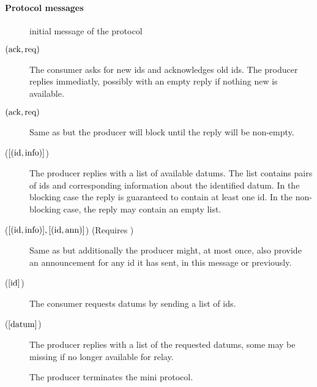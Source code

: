 \paragraph{Protocol messages}
\begin{description}
\item [\MsgInit] initial message of the protocol
\item [\MsgRequestIdsNB{} {\boldmath $(\text{ack}{},\text{req}{})$}]
      The consumer asks for new ids and acknowledges old ids.
      The producer replies immediatly, possibly with an empty reply if nothing new is available.
\item [\MsgRequestIdsB{} {\boldmath $(\text{ack}{},\text{req}{})$}]
      Same as \MsgRequestIdsNB{} but the producer will block until the reply will be non-empty.
\item [\MsgReplyIds{} {\boldmath ($[ (\text{id}{}, \text{info}) ]$) }]
      The producer replies with a list of available datums.
      The list contains pairs of ids and corresponding information about the identified datum.
      In the blocking case the reply is guaranteed to contain at least one id.
      In the non-blocking case, the reply may contain an empty list.
\item [\MsgReplyIdsAndAnns{} {($[ (\text{id}{}, \text{info}{}) ], [ (\text{id}{}, \text{ann}{}) ]$) } (Requires \Announcements{})]
      Same as \MsgReplyIds{} but additionally the producer might, at most once, also
      provide an announcement for any id it has sent, in this message or
      previously.
\item [\MsgRequestData{} {\boldmath ($[ \text{id}{} ]$)}]
      The consumer requests datums by sending a list of ids.
\item [\MsgReplyData{} {($[ \text{datum}{} ]$)}]
      The producer replies with a list of the requested datums, some may be missing if no longer available for relay.
\item [\MsgDone{}]
      The producer terminates the mini protocol.
\end{description}

